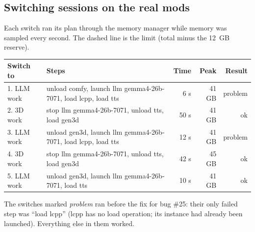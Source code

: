 \subsection*{Switching sessions on the real mods}
Each switch ran its plan through the memory manager while memory was sampled every second. The dashed line is the limit (total minus the 12~GB reserve).
\par\medskip\noindent\begin{tabular}{@{}lp{8.4cm}rrr@{}}
\toprule
Switch to & Steps & Time & Peak & Result \\
\midrule
1. LLM work & unload comfy, launch llm gemma4-26b-7071, load lcpp, load tts & 6 s & 41 GB & \textcolor{badred}{problem} \\
2. 3D work & stop llm gemma4-26b-7071, unload tts, load gen3d & 50 s & 41 GB & \textcolor{okgreen}{ok} \\
3. LLM work & unload gen3d, launch llm gemma4-26b-7071, load lcpp, load tts & 12 s & 41 GB & \textcolor{badred}{problem} \\
4. 3D work & stop llm gemma4-26b-7071, unload tts, load gen3d & 42 s & 45 GB & \textcolor{okgreen}{ok} \\
5. LLM work & unload gen3d, launch llm gemma4-26b-7071, load tts & 10 s & 41 GB & \textcolor{okgreen}{ok} \\
\bottomrule
\end{tabular}\par
\par{\footnotesize\color{muted} The switches marked \emph{problem} ran before the fix for bug \#25: their only failed step was ``load lcpp'' (lcpp has no load operation; its instance had already been launched). Everything else in them worked.}
